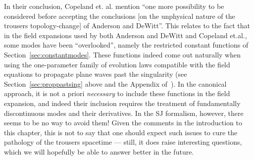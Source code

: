 \documentclass[12pt]{article}
\begin{document}
In their conclusion, Copeland et. al. mention ``one more possibility to be considered before accepting the conclusions [on the unphysical nature of the trousers topology-change] of Anderson and DeWitt''. This relates to the fact that in the field expansions used by both Anderson and DeWitt and Copeland et.al., some modes have been ``overlooked'', namely the restricted constant functions of Section~\ref{sec:constantmodes}.
These functions indeed come out naturally when using the one-parameter family of evolution laws compatible with the field equations to propagate plane waves past the singularity (see Section~\ref{sec:proppastsing} above and the Appendix of~\cite{Copeland:1988tr}). In the canonical approach, it is not a priori \emph{necessary} to include these functions in the field expansion, and indeed their inclusion requires the treatment of fundamentally discontinuous modes and their derivatives. In the SJ formalism, however, there seems to be no way to avoid them! Given the comments in the introduction to this chapter, this is not to say that one should expect such issues to cure the pathology of the trousers spacetime --- still, it does raise interesting questions, which we will hopefully be able to answer better in the future.
\end{document}
